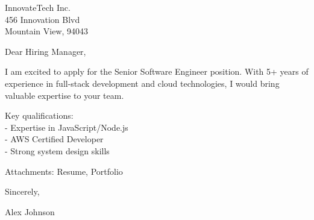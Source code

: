 \documentclass[11pt,a4paper]{letter}
\begin{document}
\begin{letter}{
InnovateTech Inc.\\
456 Innovation Blvd\\
Mountain View, 94043
}

\address{
Alex Johnson\\
123 Tech Street\\
San Francisco, 94105\\
+1 (555) 123-4567\\
\href{mailto:alex.johnson@example.com}{alex.johnson@example.com}
}

\date{June 15, 2023}

\opening{Dear Hiring Manager,}

I am excited to apply for the Senior Software Engineer position. With 5+ years of experience in full-stack development and cloud technologies, I would bring valuable expertise to your team.

Key qualifications: \\ - Expertise in JavaScript/Node.js \\ - AWS Certified Developer \\ - Strong system design skills

\vspace{\baselineskip}
\noindent Attachments: Resume, Portfolio

\closing{Sincerely,}

\vspace{0.5in}
Alex Johnson

\end{letter}
\end{document}
